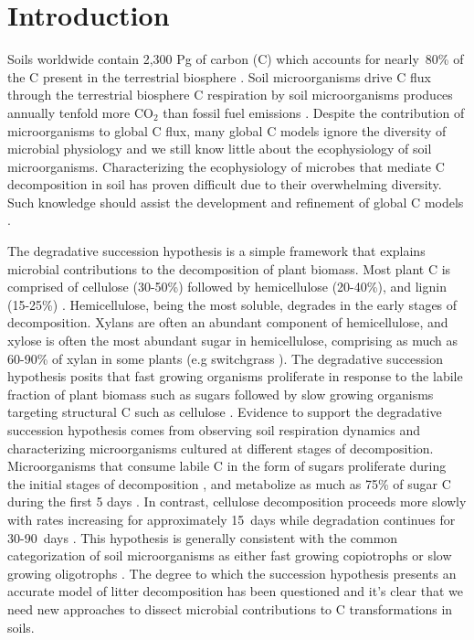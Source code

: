 \section{Introduction}
Soils worldwide contain 2,300 Pg of carbon (C) which accounts for nearly~80\%
of the C present in the terrestrial biosphere
\citep{Amundson_2001,BATJES_1996}. Soil microorganisms drive C flux through the
terrestrial biosphere C respiration by soil microorganisms
produces annually tenfold more CO$_{2}$ than fossil fuel emissions
\citep{chapin2002principles}. Despite the contribution of microorganisms to
global C flux, many global C models ignore the diversity of microbial
physiology \citep{Allison2010,Six2006,Treseder2011} and we still know little
about the ecophysiology of soil microorganisms. Characterizing the
ecophysiology of microbes that mediate C decomposition in soil has proven
difficult due to their overwhelming diversity. Such knowledge should assist
the development and refinement of global C models
\citep{Bradford2008,Neff_2001,McGuire2010,Wieder2013}.

The degradative succession hypothesis is a simple framework that explains
microbial contributions to the decomposition of plant biomass.  Most plant C is
comprised of cellulose (30-50\%) followed by hemicellulose
(20-40\%), and lignin (15-25\%) \citep{Lynd2002}. Hemicellulose, being the most
soluble, degrades in the early stages of decomposition. Xylans are often an
abundant component of hemicellulose, and xylose is often the most abundant
sugar in hemicellulose, comprising as much as 60-90\% of xylan in some plants
(e.g  switchgrass \citep{Bunnell2013}). The degradative succession hypothesis
posits that fast growing organisms proliferate in response to the labile
fraction of plant biomass such as sugars \citep{Garrett1963,Bremer1994}
followed by slow growing organisms targeting structural C such as cellulose
\citep{Garrett1963}. Evidence to support the degradative succession hypothesis
comes from observing soil respiration dynamics and characterizing
microorganisms cultured at different stages of decomposition.  Microorganisms
that consume labile C in the form of sugars proliferate during
the initial stages of decomposition \citep{Garrett1951,Alexander1964}, and
metabolize as much as 75\% of sugar C during the first 5 days
\citep{Engelking2007}. In contrast, cellulose decomposition proceeds more
slowly with rates increasing for approximately 15~days while degradation
continues for 30-90~days \citep{Hu1997,Engelking2007}. This hypothesis is
generally consistent with the common categorization of soil microorganisms as
either fast growing copiotrophs or slow growing oligotrophs \citep{Fierer2007}.
The degree to which the succession hypothesis presents an accurate model of
litter decomposition has been questioned
\citep{AnneliseHKjoller2002,Frankland_1998,Osono_2005} and it's clear that we
need new approaches to dissect microbial contributions to C transformations in
soils.


